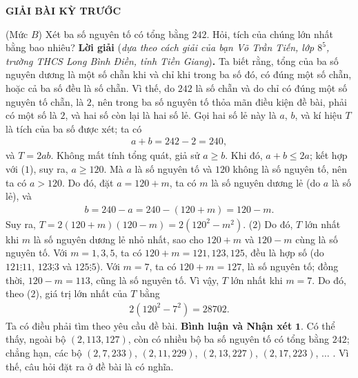 	\begin{center}
		{\large{\textbf{\color{thachthuctoanhoc}GIẢI BÀI KỲ TRƯỚC}}}
	\end{center}
\begin{multicols}{2}
	\setlength{\abovedisplayskip}{4pt}
	\setlength{\belowdisplayskip}{4pt}
	{}
	(Mức $B$) Xét ba số nguyên tố có tổng bằng $242$. Hỏi,  tích của chúng lớn nhất bằng bao nhiêu?
	\vskip 0.05cm
	\textbf{Lời giải} (\textit{dựa theo cách giải của bạn Võ Trần Tiến, lớp $8^5$, trường THCS Long Bình Điền, tỉnh Tiền Giang})\textbf{.}
	\vskip 0.05cm
	Ta biết rằng, tổng của ba số nguyên dương là một số chẵn khi và chỉ khi trong ba số đó, có đúng một số chẵn, hoặc cả ba số đều là số chẵn. Vì thế, do $242$ là số chẵn và do chỉ có đúng một số nguyên tố chẵn, là $2$, nên trong ba số nguyên tố thỏa mãn điều kiện đề bài, phải có một số là $2$, và hai số còn lại là hai số lẻ. Gọi hai số lẻ này là $a$, $b$, và kí hiệu $T$ là tích của ba số được xét; ta có
	\begin{align*}
		a + b = 242 - 2 = 240,                          \tag{$1$}
	\end{align*}
	và $T = 2ab$.
	\vskip 0.05cm
	Không mất tính tổng quát, giả sử $a \ge b$. Khi đó, $a + b \le 2a$; kết hợp với ($1$), suy ra, $a \ge 120$. Mà $a$ là số nguyên tố và $120$ không là số nguyên tố, nên ta có $a > 120$. Do đó, đặt $a = 120 + m$, ta có $m$ là số nguyên dương lẻ (do $a$ là số lẻ), và
	\begin{align*}
		b = 240 - a = 240 - (120 + m) = 120 - m.
	\end{align*}
	Suy ra, $T = 2\left( {120 + m} \right)\left( {120 - m} \right) = 2\left( {{{120}^2} - {m^2}} \right).$ \hfil ($2$)
	\vskip 0.05cm
	Do đó, $T$ lớn nhất khi $m$ là số nguyên dương lẻ nhỏ nhất, sao cho $120 + m$ và $120 - m$ cùng là số nguyên tố.
	\vskip 0.05cm
	Với $m = 1, 3, 5$, ta có $120 + m = 121, 123, 125$, đều là hợp số (do  $121 \vdots 11$, $123  \vdots  3$  và  $125 \vdots 5$).
	\vskip 0.05cm
	Với $m = 7$, ta có $120 + m = 127$, là số nguyên tố; đồng thời, $120 - m = 113$, cũng là số nguyên tố.
	\vskip 0.05cm
	Vì vậy, $T$ lớn nhất khi $m = 7$. Do đó, theo ($2$), giá trị lớn nhất của $T$ bằng
	\begin{align*}
		2\left( {{{120}^2} - {7^2}} \right) = 28702.
	\end{align*}
	Ta có điều phải tìm theo yêu cầu đề bài.
	\vskip 0.05cm
	\textbf{Bình luận và Nhận xét}
	\vskip 0.05cm	
	$\pmb{1.}$ Có thể thấy, ngoài bộ $(2, 113, 127)$, còn có nhiều bộ ba số nguyên tố có tổng bằng $242$; chẳng hạn, các bộ $(2, 7, 233)$, $(2, 11, 229)$, $(2, 13, 227)$, $(2, 17, 223)$, $\ldots$ . Vì thế, câu hỏi đặt ra ở đề bài là có nghĩa.

\end{multicols}
